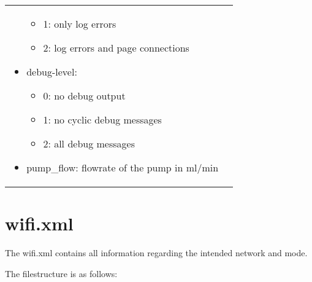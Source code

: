 \begin{tabular}{ll}
\begin{minipage}[t]{0.5\textwidth}
\begin{itemize}
\begin{itemize}
        \item 1: only log errors
        \item 2: log errors and page connections
      \end{itemize}
      \item debug-level:
      \begin{itemize}
        \item 0: no debug output
        \item 1: no cyclic debug messages
        \item 2: all debug messages
      \end{itemize}
      \item pump\_flow: flowrate of the pump in ml/min
    \end{itemize}
  \end{minipage}
\end{tabular}


\section{wifi.xml}

The wifi.xml contains all information regarding the intended network and mode. 

The filestructure is as follows:

